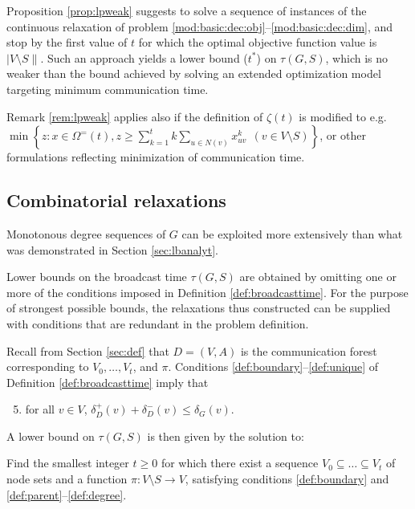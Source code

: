 \begin{remark} \label{rem:lpweak}
Proposition \ref{prop:lpweak} suggests to solve a sequence of instances of the continuous relaxation of problem \eqref{mod:basic:dec:obj}--\eqref{mod:basic:dec:dim},
and stop by the first value of $t$ for which the optimal objective function value is $\left|V\setminus S\right\|$.
Such an approach yields a lower bound ($t^{\ast}$) on $\tau(G,S)$,
which is no weaker than the bound achieved by solving an extended optimization model targeting minimum communication time.
\end{remark}

\begin{remark} \label{rem:otheropt}
Remark \ref{rem:lpweak} applies also if the definition of $\zeta(t)$ is modified to e.g.
$\min\left\{z: x\in\Omega^=(t), z\geq\sum\limits_{k=1}^tk\sum\limits_{u \in N(v)}x_{uv}^k ~~(v\in V\setminus S)\right\}$,
or other formulations reflecting minimization of communication time.
\end{remark}

\subsection{Combinatorial relaxations} \label{sec:lbcombrel}

Monotonous degree sequences of $G$ can be exploited more extensively than what was demonstrated in Section \ref{sec:lbanalyt}. 

Lower bounds on the broadcast time $\tau(G,S)$ are obtained by omitting one or more of the conditions imposed in Definition \ref{def:broadcasttime}.
For the purpose of strongest possible bounds, the relaxations thus constructed can be supplied with conditions that are redundant in the problem definition.

Recall from Section \ref{sec:def} that $D=(V,A)$ is the communication forest corresponding to $V_0,\ldots,V_t$, and $\pi$.
Conditions \ref{def:boundary}--\ref{def:unique} of Definition \ref{def:broadcasttime} imply that
\begin{enumerate}
\setcounter{enumi}{4}
  \item for all $v\in V$, $\delta_D^+(v)+\delta_D^-(v)\leq\delta_G(v)$. \label{def:degree}
\end{enumerate}

\noindent
A lower bound on $\tau(G,S)$ is then given by the solution to:
\begin{problem}\label{prob:degree}
Find the smallest integer $t\geq 0$ for which there exist
a sequence $V_0\subseteq\dots\subseteq V_t$ of node sets and a function $\pi:V\setminus S\to V$,
satisfying conditions \ref{def:boundary} and \ref{def:parent}--\ref{def:degree}.
\end{problem}

